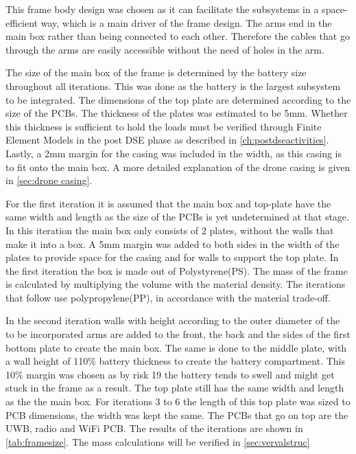 This frame body design was chosen as it can facilitate the subsystems in a space-efficient way, which is a main driver of the frame design. The arms end in the main box rather than being connected to each other. Therefore the cables that go through the arms are easily accessible without the need of holes in the arm.

The size of the main box of the frame is determined by the battery size throughout all iterations. This was done as the battery is the largest subsystem to be integrated. The dimensions of the top plate are determined according to the size of the PCBs. The thickness of the plates was estimated to be 5mm. Whether this thickness is sufficient to hold the loads must be verified through Finite Element Models in the post DSE phase as described in \autoref{ch:postdseactivities}. Lastly, a 2mm margin for the casing was included in the width, as this casing is to fit onto the main box. A more detailed explanation of the drone casing is given in \autoref{sec:drone casing}.

For the first iteration it is assumed that the main box and top-plate have the same width and length as the size of the PCBs is yet undetermined at that stage. In this iteration the main box only consists of 2 plates, without the walls that make it into a box. A 5mm margin was added to both sides in the width of the plates to provide space for the casing and for walls to support the top plate. In the first iteration the box is made out of Polystyrene(PS). The mass of the frame is calculated by multiplying the volume with the material density. The iterations that follow use polypropylene(PP), in accordance with the material trade-off.

In the second iteration walls with height according to the outer diameter of the to be incorporated arms are added to the front, the back and the sides of the first bottom plate to create the main box. The same is done to the middle plate, with a wall height of 110\% battery thickness to create the battery compartment. This 10\% margin was chosen as by risk 19 the battery tends to swell and might get stuck in the frame as a result. The top plate still has the same width and length as the the main box. For iterations 3 to 6 the length of this top plate was sized to PCB dimensions, the width was kept the same. The PCBs that go on top are the UWB, radio and WiFi PCB. The results of the iterations are shown in \autoref{tab:framesize}. The mass calculations will be verified in \autoref{sec:vervalstruc}

